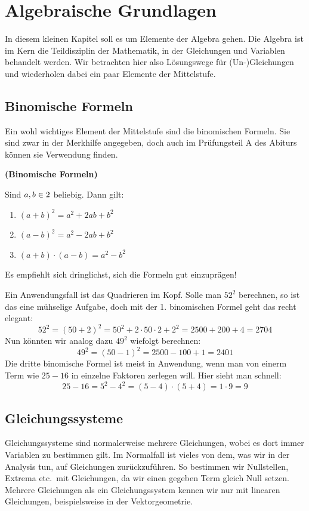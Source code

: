 \documentclass[ngerman, 12pt]{nssheetxea}
\begin{document}
\newpage

\section{Algebraische Grundlagen}
In diesem kleinen Kapitel soll es um Elemente der Algebra gehen. Die Algebra ist im Kern die Teildisziplin der Mathematik, in der Gleichungen und Variablen behandelt werden. Wir betrachten hier also Lösungswege für (Un-)Gleichungen und wiederholen dabei ein paar Elemente der Mittelstufe.
\subsection{Binomische Formeln}
Ein wohl wichtiges Element der Mittelstufe sind die binomischen Formeln. Sie sind zwar in der Merkhilfe angegeben, doch auch im Prüfungsteil A des Abiturs können sie Verwendung finden.
\begin{theorem} \textbf{(Binomische Formeln)} \par
Sind $a,b\in 2$ beliebig. Dann gilt:
\begin{enumerate}
\item $(a+b)^2=a^2+2ab+b^2$
\item $(a-b)^2=a^2-2ab+b^2$
\item $(a+b)\cdot (a-b)=a^2-b^2$
\end{enumerate}
 
\end{theorem}
Es empfiehlt sich dringlichst, sich die Formeln gut einzuprägen!

\begin{example}
Ein Anwendungsfall ist das Quadrieren im Kopf. Solle man $52^2$ berechnen, so ist das eine mühselige Aufgabe, doch mit der 1. binomischen Formel geht das recht elegant: 
\[ 52^2 = (50+2)^2 = 50^2+2\cdot 50 \cdot 2 + 2^2 = 2500 + 200 + 4 = 2704\]
Nun könnten wir analog dazu $49^2$ wiefolgt berechnen:
\[ 49^2 = (50-1)^2 = 2500 - 100 +1 = 2401\]
Die dritte binomische Formel ist meist in Anwendung, wenn man von einerm Term wie $25-16$ in einzelne Faktoren zerlegen will. Hier sieht man schnell: 
\[ 25-16 = 5^2-4^2 = (5-4)\cdot (5+4) = 1 \cdot 9 = 9\]
\end{example}

\newpage

\subsection{Gleichungssysteme}
Gleichungssysteme sind normalerweise mehrere Gleichungen, wobei es dort immer Variablen zu bestimmen gilt. Im Normalfall ist vieles von dem, was wir in der Analysis tun, auf Gleichungen zurückzuführen. So bestimmen wir Nullstellen, Extrema etc.\ mit Gleichungen, da wir einen gegeben Term gleich Null setzen. Mehrere Gleichungen als ein Gleichungssystem kennen wir nur mit linearen Gleichungen, beispielsweise in der Vektorgeometrie. 
\end{document}
